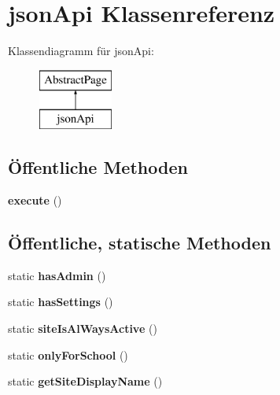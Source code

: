 \hypertarget{classjson_api}{}\section{json\+Api Klassenreferenz}
\label{classjson_api}
Klassendiagramm für json\+Api\+:\begin{figure}[H]
\begin{center}
\leavevmode
\includegraphics[height=2.000000cm]{classjson_api}
\end{center}
\end{figure}
\subsection*{Öffentliche Methoden}
\begin{DoxyCompactItemize}
\item 
\mbox{\label{classjson_api_ac1343b343e1e4ec78d64151dabc2ada8}} 
{\bfseries execute} ()
\end{DoxyCompactItemize}
\subsection*{Öffentliche, statische Methoden}
\begin{DoxyCompactItemize}
\item 
\mbox{\label{classjson_api_aa33cf24806bf9358910d5a7f8c287755}} 
static {\bfseries has\+Admin} ()
\item 
\mbox{\label{classjson_api_a4dbdf07f99a2fe9436c2cb3461a7fd64}} 
static {\bfseries has\+Settings} ()
\item 
\mbox{\label{classjson_api_ab0fdbb87b177b4c68ca04aba34b992dd}} 
static {\bfseries site\+Is\+Al\+Ways\+Active} ()
\item 
\mbox{\label{classjson_api_a248d35c3fd0900d58dbba71a183a1c09}} 
static {\bfseries only\+For\+School} ()
\item 
\mbox{\label{classjson_api_a8d77f8815932c5f519093c3a84d01714}} 
static {\bfseries get\+Site\+Display\+Name} ()
\end{DoxyCompactItemize}
